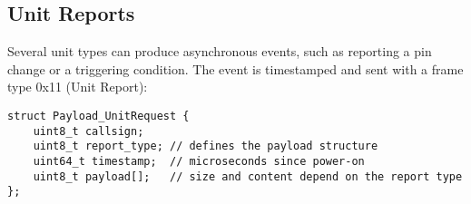 \subsection{Unit Reports}

Several unit types can produce asynchronous events, such as reporting a pin change or a triggering condition. The event is timestamped and sent with a frame type 0x11 (Unit Report):

\begin{verbatim}
struct Payload_UnitRequest {
    uint8_t callsign;
    uint8_t report_type; // defines the payload structure
    uint64_t timestamp;  // microseconds since power-on
    uint8_t payload[];   // size and content depend on the report type
};
\end{verbatim}


















